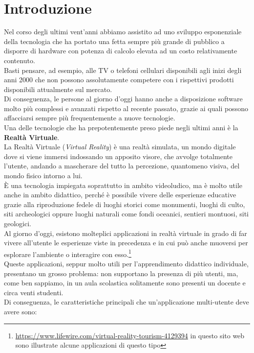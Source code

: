 \chapter{Introduzione}
Nel corso degli ultimi vent'anni abbiamo assistito ad uno sviluppo esponenziale della tecnologia che ha portato una fetta sempre più grande di pubblico a disporre di hardware con potenza di calcolo elevata ad un costo relativamente contenuto.
\\Basti pensare, ad esempio, alle TV o telefoni cellulari disponibili agli inizi degli anni 2000 che non possono assolutamente competere con i rispettivi prodotti disponibili attualmente sul mercato.
\\Di conseguenza, le persone al giorno d'oggi hanno anche a disposizione software molto più complessi e avanzati rispetto al recente passato, grazie ai quali possono affacciarsi sempre più frequentemente a nuove tecnologie.
\\Una delle tecnologie che ha prepotentemente preso piede negli ultimi anni è la \textbf{Realtà Virtuale}.
\\La Realtà Virtuale (\textit{Virtual Reality}) è una realtà simulata, un mondo digitale dove si viene immersi indossando un apposito visore, che avvolge totalmente l'utente, andando a mascherare del tutto la percezione, quantomeno visiva, del mondo fisico intorno a lui.
\\È una tecnologia impiegata soprattutto in ambito videoludico, ma è molto utile anche in ambito didattico, perché è possibile vivere delle esperienze educative grazie alla riproduzione fedele di luoghi storici come monumenti, luoghi di culto, siti archeologici oppure luoghi naturali come fondi oceanici, sentieri montuosi, siti geologici.
\\Al giorno d'oggi, esistono molteplici applicazioni in realtà virtuale in grado di far vivere all'utente le esperienze viste in precedenza e in cui può anche muoversi per esplorare l'ambiente o interagire con esso.\footnote{\url{https://www.lifewire.com/virtual-reality-tourism-4129394} in questo sito web sono illustrate alcune applicazioni di questo tipo}
\\Queste applicazioni, seppur molto utili per l'apprendimento didattico individuale, presentano un grosso problema: non supportano la presenza di più utenti, ma, come ben sappiamo, in un aula scolastica solitamente sono presenti un docente e circa venti studenti.
\\Di conseguenza, le caratteristiche principali che un'applicazione multi-utente deve avere sono:
